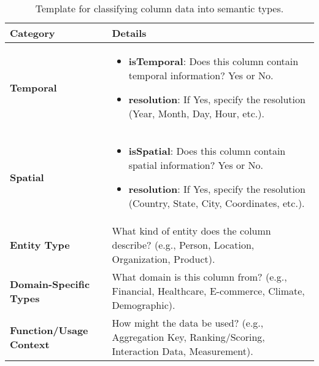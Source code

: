 \begin{table*}
    \small
    \centering
    \begin{tabular}{|p{3cm}|p{11cm}|}
    \hline
    \textbf{Category} & \textbf{Details} \\
    \hline
    \textbf{Temporal} & 
    \begin{itemize}
        \item \textbf{isTemporal}: Does this column contain temporal information? Yes or No.
        \item \textbf{resolution}: If Yes, specify the resolution (Year, Month, Day, Hour, etc.).
    \end{itemize} \\
    \hline
    \textbf{Spatial} & 
    \begin{itemize}
        \item \textbf{isSpatial}: Does this column contain spatial information? Yes or No.
        \item \textbf{resolution}: If Yes, specify the resolution (Country, State, City, Coordinates, etc.).
    \end{itemize} \\
    \hline
    \textbf{Entity Type} & What kind of entity does the column describe? (e.g., Person, Location, Organization, Product). \\
    \hline
    \textbf{Domain-Specific Types} & What domain is this column from? (e.g., Financial, Healthcare, E-commerce, Climate, Demographic). \\
    \hline
    \textbf{Function/Usage Context} & How might the data be used? (e.g., Aggregation Key, Ranking/Scoring, Interaction Data, Measurement). \\
    \hline
    \end{tabular}
    \caption{Template for classifying column data into semantic types.}
    \label{tab:template}
\end{table*}
